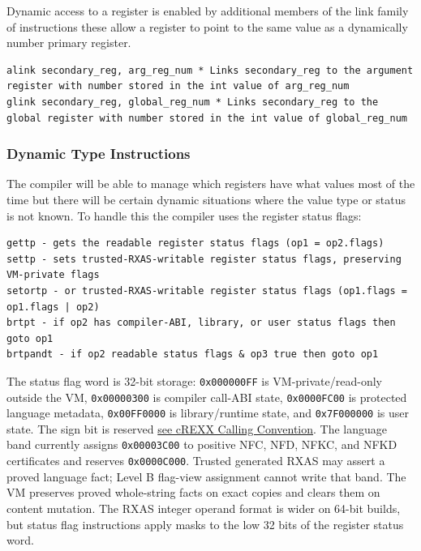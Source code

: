 Dynamic access to a register is enabled by additional members of the
link family of instructions these allow a register to point to the same
value as a dynamically number primary register.

\begin{verbatim}
alink secondary_reg, arg_reg_num * Links secondary_reg to the argument register with number stored in the int value of arg_reg_num 
glink secondary_reg, global_reg_num * Links secondary_reg to the global register with number stored in the int value of global_reg_num 
\end{verbatim}

\hypertarget{dynamic-type-instructions}{%
\subsubsection{Dynamic Type
Instructions}\label{dynamic-type-instructions}}

The compiler will be able to manage which registers have what values
most of the time but there will be certain dynamic situations where the
value type or status is not known. To handle this the compiler uses the
register status flags:

\begin{verbatim}
gettp - gets the readable register status flags (op1 = op2.flags)
settp - sets trusted-RXAS-writable register status flags, preserving VM-private flags
setortp - or trusted-RXAS-writable register status flags (op1.flags = op1.flags | op2)
brtpt - if op2 has compiler-ABI, library, or user status flags then goto op1
brtpandt - if op2 readable status flags & op3 true then goto op1
\end{verbatim}

The status flag word is 32-bit storage:
\texttt{0x000000FF} is VM-private/read-only outside the VM,
\texttt{0x00000300} is compiler call-ABI state,
\texttt{0x0000FC00} is protected language metadata,
\texttt{0x00FF0000} is library/runtime state, and
\texttt{0x7F000000} is user state. The sign bit is reserved
\protect\hyperlink{crexx-calling-convention}{see cREXX Calling Convention}.
The language band currently assigns \texttt{0x00003C00} to positive NFC, NFD,
NFKC, and NFKD certificates and reserves \texttt{0x0000C000}. Trusted
generated RXAS may assert a proved language fact; Level B flag-view assignment
cannot write that band. The VM preserves proved whole-string facts on exact
copies and clears them on content mutation.
The RXAS integer operand format is wider on 64-bit builds, but status flag
instructions apply masks to the low 32 bits of the register status word.

